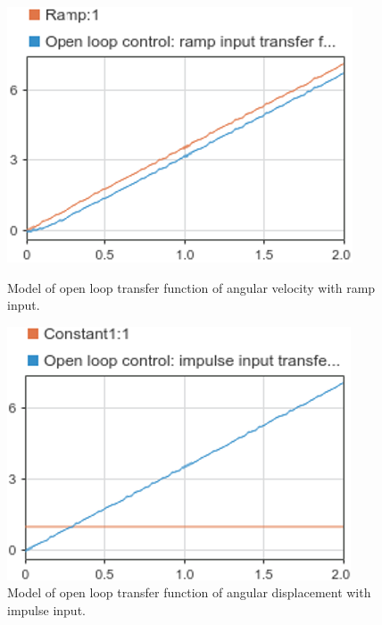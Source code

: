 \documentclass[conference]{IEEEtran}
\begin{document}
\begin{figure}[htbp]
    \centering
    \begin{minipage}[b]{0.24\textwidth}
      \includegraphics[width=\textwidth]{../img/q1-5.png}
      \caption{Model of open loop transfer function of angular velocity with ramp input.}
    \end{minipage}
    \hfill
    \begin{minipage}[b]{0.24\textwidth}
      \includegraphics[width=\textwidth]{../img/q1-7.png}
      \caption{Model of open loop transfer function of angular displacement with impulse input.}
    \end{minipage}
\end{figure}
\end{document}
